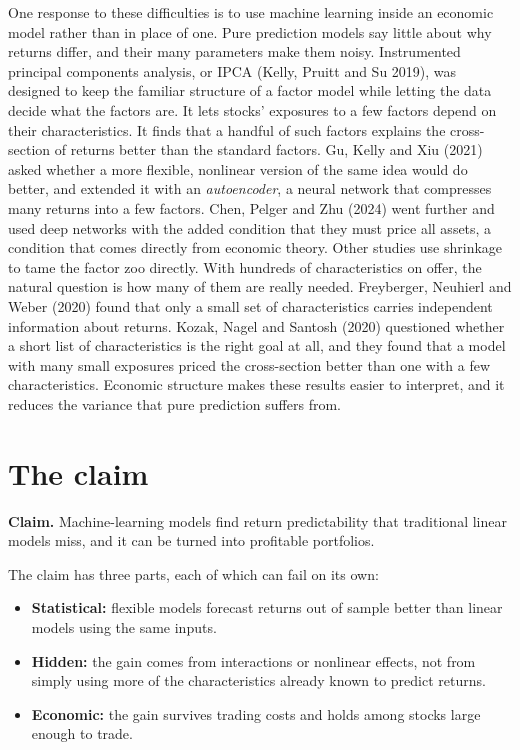 One response to these difficulties is to use machine learning inside an economic model rather than in place of one. Pure prediction models say little about why returns differ, and their many parameters make them noisy. Instrumented principal components analysis, or IPCA (Kelly, Pruitt and Su 2019), was designed to keep the familiar structure of a factor model while letting the data decide what the factors are. It lets stocks' exposures to a few factors depend on their characteristics. It finds that a handful of such factors explains the cross-section of returns better than the standard factors. Gu, Kelly and Xiu (2021) asked whether a more flexible, nonlinear version of the same idea would do better, and extended it with an \emph{autoencoder}, a neural network that compresses many returns into a few factors. Chen, Pelger and Zhu (2024) went further and used deep networks with the added condition that they must price all assets, a condition that comes directly from economic theory. Other studies use shrinkage to tame the factor zoo directly. With hundreds of characteristics on offer, the natural question is how many of them are really needed. Freyberger, Neuhierl and Weber (2020) found that only a small set of characteristics carries independent information about returns. Kozak, Nagel and Santosh (2020) questioned whether a short list of characteristics is the right goal at all, and they found that a model with many small exposures priced the cross-section better than one with a few characteristics. Economic structure makes these results easier to interpret, and it reduces the variance that pure prediction suffers from.

\section{The claim}
\label{sec:20-claim}

\begin{callout}
\textbf{Claim.} Machine-learning models find return predictability that traditional linear models miss, and it can be turned into profitable portfolios.
\end{callout}

The claim has three parts, each of which can fail on its own:

\begin{itemize}
  \item \textbf{Statistical:} flexible models forecast returns out of sample better than linear models using the same inputs.
  \item \textbf{Hidden:} the gain comes from interactions or nonlinear effects, not from simply using more of the characteristics already known to predict returns.
  \item \textbf{Economic:} the gain survives trading costs and holds among stocks large enough to trade.
\end{itemize}

